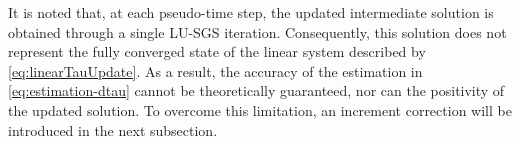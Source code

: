 
It is noted that, at each pseudo-time step, the updated intermediate solution is obtained through a single LU-SGS iteration. Consequently, this solution does not represent the fully converged state of the linear system described by \eqref{eq:linearTauUpdate}. As a result, the accuracy of the estimation in \eqref{eq:estimation-dtau} cannot be theoretically guaranteed, nor can the positivity of the updated solution. %
To overcome this limitation, an increment correction will be introduced in the next subsection.


